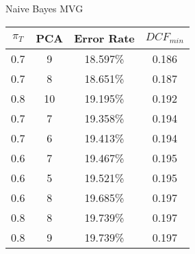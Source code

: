 \caption{Naive Bayes MVG}\label{tab:mvg_naiveacctable}
\begin{center}
\begin{tabular}{|c|c|c|c|}
\hline
$\pi_T$ & PCA & Error Rate & $DCF_{min}$\\
\hline
0.7 & 9 & 18.597\% & 0.186\\
\hline
0.7 & 8 & 18.651\% & 0.187\\
\hline
0.8 & 10 & 19.195\% & 0.192\\
\hline
0.7 & 7 & 19.358\% & 0.194\\
\hline
0.7 & 6 & 19.413\% & 0.194\\
\hline
0.6 & 7 & 19.467\% & 0.195\\
\hline
0.6 & 5 & 19.521\% & 0.195\\
\hline
0.6 & 8 & 19.685\% & 0.197\\
\hline
0.8 & 8 & 19.739\% & 0.197\\
\hline
0.8 & 9 & 19.739\% & 0.197\\
\hline
\end{tabular}
\end{center}
